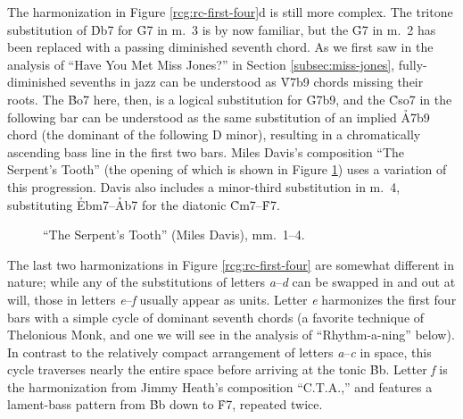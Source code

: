 The harmonization in Figure \ref{rcg:rc-first-four}d is still more complex.
The tritone substitution of \h{Db7} for \h{G7} in m.~3 is by now familiar, but
the \h{G7} in m.~2 has been replaced with a passing diminished seventh chord.
As we first saw in the analysis of ``Have You Met Miss Jones?'' in Section
\ref{subsec:miss-jones}, fully-diminished sevenths in jazz can be understood
as \h{V7b9} chords missing their roots. The \h{Bo7} here, then, is a logical
substitution for \h{G7b9}, and the \h{Cso7} in the following bar can be
understood as the same substitution of an implied \h{A7b9} chord (the dominant
of the following D minor), resulting in a chromatically ascending bass line in
the first two bars. Miles Davis's composition ``The Serpent's Tooth'' (the
opening of which is shown in Figure \ref{rcg:serpents-tooth}) uses a variation
of this progression. Davis also includes a minor-third substitution in m.~4,
substituting \h{Ebm7}--\h{Ab7} for the diatonic \h{Cm7}--\h{F7}.

\begin{figure}[tbp]
  \caption{``The Serpent's Tooth'' (Miles Davis), mm.~1--4.}
  \label{rcg:serpents-tooth}
\end{figure}

The last two harmonizations in Figure \ref{rcg:rc-first-four} are somewhat
different in nature; while any of the substitutions of letters
\emph{a}--\emph{d} can be swapped in and out at will, those in letters
\emph{e}--\emph{f} usually appear as units. Letter \emph{e} harmonizes the
first four bars with a simple cycle of dominant seventh chords (a favorite
technique of Thelonious Monk, and one we will see in the analysis of
``Rhythm-a-ning'' below). In contrast to the relatively compact arrangement of
letters \emph{a}--\emph{c} in \tf space, this cycle traverses nearly the
entire space before arriving at the tonic \h{Bb}. Letter \emph{f} is
the harmonization from Jimmy Heath's composition ``C.T.A.,'' and features a
lament-bass pattern from \h{Bb} down to \h{F7}, repeated twice.


